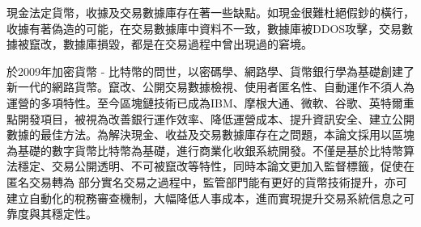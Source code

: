 

現金法定貨幣，收據及交易數據庫存在著一些缺點。如現金很難杜絕假鈔的橫行，收據有著偽造的可能，在交易數據庫中資料不一致，數據庫被DDOS攻擊，交易數據被竄改，數據庫損毀，都是在交易過程中曾出現過的窘境。

於2009年加密貨幣 - 比特幣的問世，以密碼學、網路學、貨幣銀行學為基礎創建了新一代的網路貨幣。竄改、公開交易數據檢視、使用者匿名性、自動運作不須人為運營的多項特性。至今區塊鏈技術已成為IBM、摩根大通、微軟、谷歌、英特爾重點開發項目，被視為改善銀行運作效率、降低運營成本、提升資訊安全、建立公開數據的最佳方法。為解決現金、收益及交易數據庫存在之問題，本論文採用以區塊為基礎的數字貨幣比特幣為基礎，進行商業化收銀系統開發。不僅是基於⽐特幣算法穩定、交易公開透明、不可被竄改等特性，同時本論⽂更加⼊監督標籤，促使在匿名交易轉為
部分實名交易之過程中，監管部⾨能有更好的貨幣技術提升，亦可建立自動化的稅務審查機制，大幅降低人事成本，進而實現提升交易系統信息之可靠度與其穩定性。